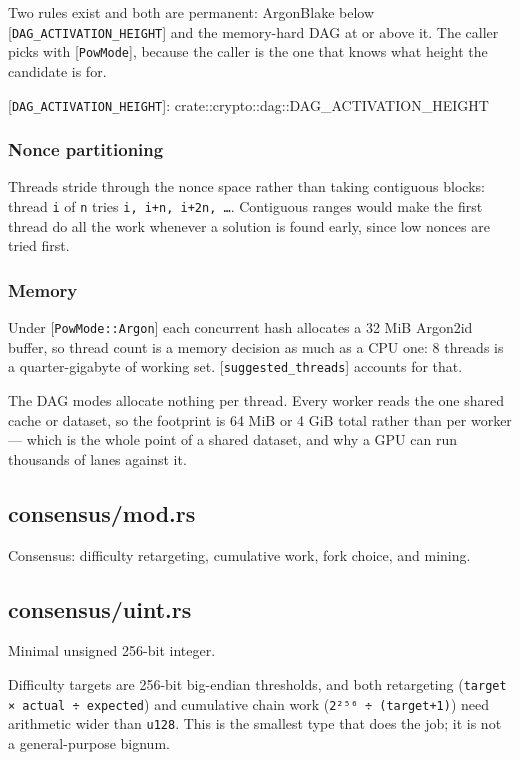 \documentclass[11pt,a4paper]{article}
\begin{document}
Two rules exist and both are permanent: ArgonBlake below
[\texttt{DAG\_ACTIVATION\_HEIGHT}] and the memory-hard DAG at or above it. The caller
picks with [\texttt{PowMode}], because the caller is the one that knows what height
the candidate is for.

[\texttt{DAG\_ACTIVATION\_HEIGHT}]: crate::crypto::dag::DAG\_ACTIVATION\_HEIGHT

\subsubsection{Nonce partitioning}

Threads stride through the nonce space rather than taking contiguous blocks:
thread \texttt{i} of \texttt{n} tries \texttt{i, i+n, i+2n, …}. Contiguous ranges would make the
first thread do all the work whenever a solution is found early, since low
nonces are tried first.

\subsubsection{Memory}

Under [\texttt{PowMode::Argon}] each concurrent hash allocates a 32 MiB Argon2id
buffer, so thread count is a memory decision as much as a CPU one: 8 threads
is a quarter-gigabyte of working set. [\texttt{suggested\_threads}] accounts for
that.

The DAG modes allocate nothing per thread. Every worker reads the one shared
cache or dataset, so the footprint is 64 MiB or 4 GiB total rather than per
worker — which is the whole point of a shared dataset, and why a GPU can run
thousands of lanes against it.

\subsection{consensus/mod.rs}
Consensus: difficulty retargeting, cumulative work, fork choice, and mining.

\subsection{consensus/uint.rs}
Minimal unsigned 256-bit integer.

Difficulty targets are 256-bit big-endian thresholds, and both retargeting
(\texttt{target × actual ÷ expected}) and cumulative chain work (\texttt{2²⁵⁶ ÷ (target+1)})
need arithmetic wider than \texttt{u128}. This is the smallest type that does the
job; it is not a general-purpose bignum.
\end{document}
